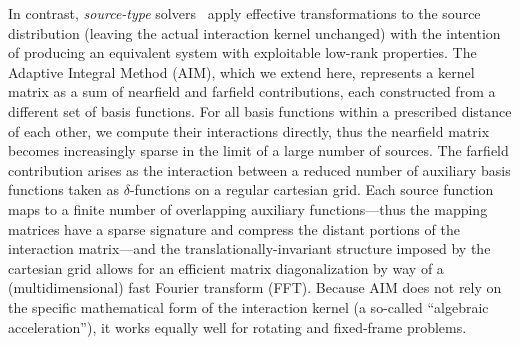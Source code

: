 In contrast, \emph{source-type} solvers~\cite{Bleszynski1996,Yilmaz2004,Kapur1997} apply effective transformations to the source distribution (leaving the actual interaction kernel unchanged) with the intention of producing an equivalent system with exploitable low-rank properties.
The Adaptive Integral Method (AIM), which we extend here, represents a kernel matrix as a sum of nearfield and farfield contributions, each constructed from a different set of basis functions.
For all basis functions within a prescribed distance of each other, we compute their interactions directly, thus the nearfield matrix becomes increasingly sparse in the limit of a large number of sources.
The farfield contribution arises as the interaction between a reduced number of auxiliary basis functions taken as $\delta$-functions on a regular cartesian grid.
Each source function maps to a finite number of overlapping auxiliary functions---thus the mapping matrices have a sparse signature and compress the distant portions of the interaction matrix---and the translationally-invariant structure imposed by the cartesian grid allows for an efficient matrix diagonalization by way of a (multidimensional) fast Fourier transform (FFT).
Because AIM does not rely on the specific mathematical form of the interaction kernel (a so-called ``algebraic acceleration''), it works equally well for rotating and fixed-frame problems.

